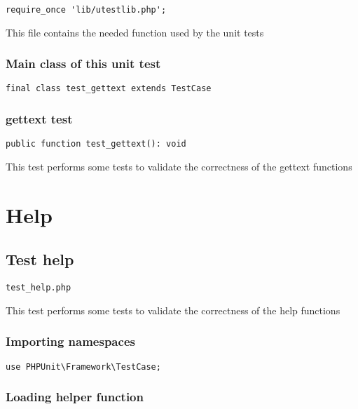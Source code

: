 \documentclass[a4paper]{article}
\begin{document}
\begin{lstlisting}
require_once 'lib/utestlib.php';
\end{lstlisting}

This file contains the needed function used by the unit tests

\hypertarget{toc224}{}
\subsubsection{Main class of this unit test}

\begin{lstlisting}
final class test_gettext extends TestCase
\end{lstlisting}

\hypertarget{toc225}{}
\subsubsection{gettext test}

\begin{lstlisting}
public function test_gettext(): void
\end{lstlisting}

This test performs some tests to validate the correctness
of the gettext functions


\hypertarget{toc226}{}
\section{Help}

\hypertarget{toc227}{}
\subsection{Test help}

\begin{lstlisting}
test_help.php
\end{lstlisting}

This test performs some tests to validate the correctness
of the help functions

\hypertarget{toc228}{}
\subsubsection{Importing namespaces}

\begin{lstlisting}
use PHPUnit\Framework\TestCase;
\end{lstlisting}

\hypertarget{toc229}{}
\subsubsection{Loading helper function}
\end{document}
